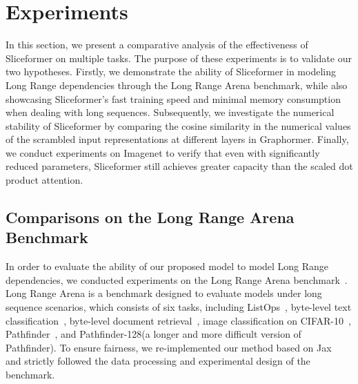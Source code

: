 \section{Experiments}\label{sec:exp}
In this section, we present a comparative analysis of the effectiveness of Sliceformer on multiple tasks. 
The purpose of these experiments is to validate our two hypotheses. 
Firstly, we demonstrate the ability of Sliceformer in modeling Long Range dependencies through the Long Range Arena benchmark, while also showcasing Sliceformer's fast training speed and minimal memory consumption when dealing with long sequences. 
Subsequently, we investigate the numerical stability of Sliceformer by comparing the cosine similarity in the numerical values of the scrambled input representations at different layers in Graphormer. 
Finally, we conduct experiments on Imagenet to verify that even with significantly reduced parameters, Sliceformer still achieves greater capacity than the scaled dot product attention.

\subsection{Comparisons on the Long Range Arena Benchmark}
In order to evaluate the ability of our proposed model to model Long Range dependencies, we conducted experiments on the Long Range Arena benchmark~\cite{tay2021long}. 
Long Range Arena is a benchmark designed to evaluate models under long sequence scenarios, which consists of six tasks, including ListOps~\cite{nangia2018listops}, byte-level text classification~\cite{maas2011learning}, byte-level document retrieval~\cite{radev2013acl}, image classification on CIFAR-10~\cite{krizhevsky2009learning}, Pathfinder~\cite{linsley2018learning}, and Pathfinder-128(a longer and more difficult version of Pathfinder). 
To ensure fairness, we re-implemented our method based on Jax~\cite{bradbury2018jax} and strictly followed the data processing and experimental design of the benchmark.


